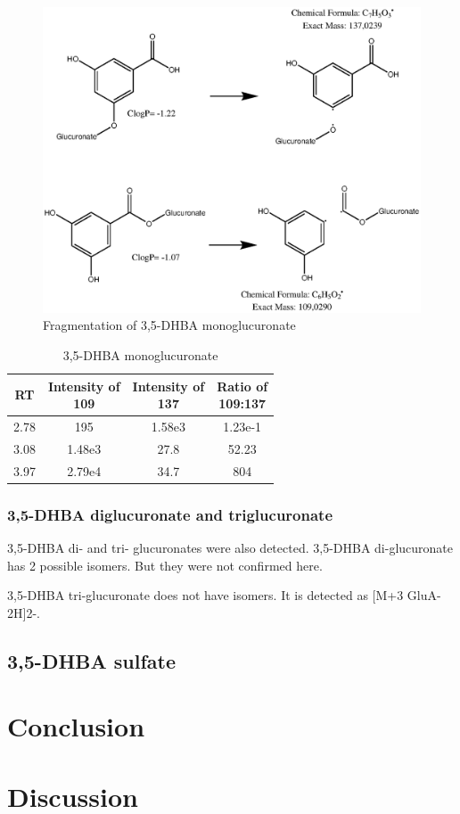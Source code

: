 \begin{figure}[h!]
	\centering
	\includegraphics[width=1\linewidth]{picture/3,5-DHBA-glca-mono}
	\caption{Fragmentation of 3,5-DHBA monoglucuronate}
	\label{fig:35-dhba-glca-mono}
\end{figure}

\begin{table}[h!]
	\centering
\begin{tabular}{|c|c|c|c|}
	\hline 
	RT & \makecell{Intensity of\\ 109} & \makecell{Intensity of\\ 137} & \makecell{Ratio of \\109:137} \\ 
	\hline 
	2.78 & 195 & 1.58e3 & 1.23e-1 \\ 
	\hline 
	3.08 & 1.48e3 & 27.8 & 52.23 \\ 
	\hline 
	3.97 & 2.79e4 & 34.7 & 804 \\ 
	\hline 
\end{tabular} 
\caption{3,5-DHBA monoglucuronate}
\label{tab:35-dhba-monoglucuronate}
\end{table}

\subsubsection{3,5-DHBA diglucuronate and triglucuronate}
3,5-DHBA di- and tri- glucuronates were also detected.
3,5-DHBA di-glucuronate has 2 possible isomers. But they were not confirmed here.

3,5-DHBA tri-glucuronate does not have isomers. It is detected as [M+3 GluA-2H]2-.

\subsection{3,5-DHBA sulfate}



\section{Conclusion}


\section{Discussion}